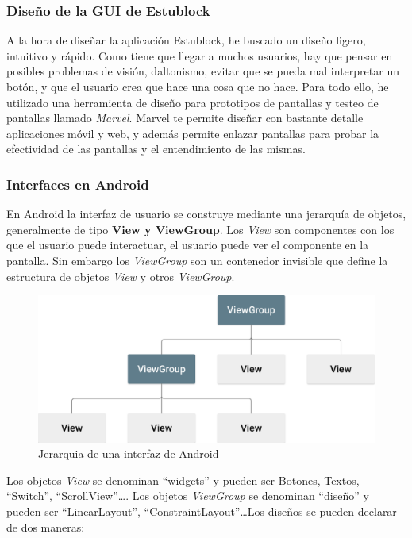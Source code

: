 \subsubsection{Diseño de la GUI de Estublock}

A la hora de diseñar la aplicación Estublock, he buscado un diseño ligero, intuitivo y rápido. Como tiene que llegar a muchos usuarios, hay que pensar en posibles problemas de visión, daltonismo, evitar que se pueda mal interpretar un botón, y que el usuario crea que hace una cosa que no hace. Para todo ello, he utilizado una herramienta de diseño para prototipos de pantallas y testeo de pantallas llamado \emph{Marvel}\cite{marvelapp}. Marvel te permite diseñar con bastante detalle aplicaciones móvil y web, y además permite enlazar pantallas para probar la efectividad de las pantallas y el entendimiento de las mismas.

\subsubsection{Interfaces en Android}

En Android la interfaz de usuario se construye mediante una jerarquía de objetos, generalmente de tipo \textbf{View y ViewGroup}. Los \emph{View} son componentes con los que el usuario puede interactuar, el usuario puede ver el componente en la pantalla. Sin embargo los \emph{ViewGroup} son un contenedor invisible que define la estructura de objetos \emph{View} y otros \emph{ViewGroup}.

\begin{figure}[h!]
  \centering
  \includegraphics[width=0.6\linewidth]{figs/Desarrollo/Jerarquia}
  \caption[Android Layout]{Jerarquia de una interfaz de Android}
  \label{fig:interfaz_android}
\end{figure}

Los objetos \emph{View} se denominan ``widgets'' y pueden ser Botones, Textos, ``Switch'', ``ScrollView''\dots. Los objetos \emph{ViewGroup} se denominan ``diseño'' y pueden ser ``LinearLayout'', ``ConstraintLayout''\dots Los diseños se pueden declarar de dos maneras: \\

